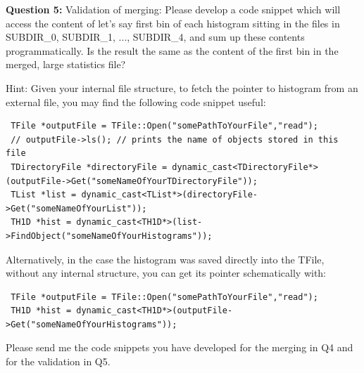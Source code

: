 \documentclass[11pt]{article}
\begin{document}
\vspace{0.144cm}

\noindent\textbf{Question 5:} Validation of merging: Please develop a code snippet which will access the content of let's say first bin of each histogram sitting in the files in SUBDIR\_0,  SUBDIR\_1, ...,  SUBDIR\_4, and sum up these contents programmatically. Is the result the same as the content of the first bin in the merged, large statistics file?

\vspace{0.1044cm}

\noindent Hint: Given your internal file structure, to fetch the pointer to histogram from an external file, you may find the following code snippet useful:
%
{\footnotesize
\begin{verbatim}
 TFile *outputFile = TFile::Open("somePathToYourFile","read");
 // outputFile->ls(); // prints the name of objects stored in this file
 TDirectoryFile *directoryFile = dynamic_cast<TDirectoryFile*>(outputFile->Get("someNameOfYourTDirectoryFile"));
 TList *list = dynamic_cast<TList*>(directoryFile->Get("someNameOfYourList"));
 TH1D *hist = dynamic_cast<TH1D*>(list->FindObject("someNameOfYourHistograms"));
\end{verbatim}}

\noindent Alternatively, in the case the histogram was saved directly into the TFile, without any internal structure, you can get its pointer schematically with:
%
{\footnotesize
\begin{verbatim}
 TFile *outputFile = TFile::Open("somePathToYourFile","read");
 TH1D *hist = dynamic_cast<TH1D*>(outputFile->Get("someNameOfYourHistograms"));
\end{verbatim}}


\noindent Please send me the code snippets you have developed for the merging in Q4 and for the validation in Q5. 
\end{document}
